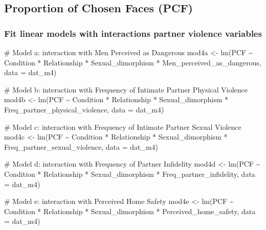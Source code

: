 \documentclass[
  bookmarksnumbered]{article}
\newenvironment{Shaded}{\begin{snugshade}}{\end{snugshade}}
\newcommand{\AttributeTok}[1]{\textcolor[rgb]{0.80,0.80,0.80}{#1}}
\newcommand{\CommentTok}[1]{\textcolor[rgb]{0.50,0.62,0.50}{#1}}
\newcommand{\FunctionTok}[1]{\textcolor[rgb]{0.94,0.94,0.56}{#1}}
\newcommand{\NormalTok}[1]{\textcolor[rgb]{0.80,0.80,0.80}{#1}}
\newcommand{\OtherTok}[1]{\textcolor[rgb]{0.94,0.94,0.56}{#1}}
\newcommand{\SpecialCharTok}[1]{\textcolor[rgb]{0.86,0.64,0.64}{#1}}
\begin{document}
\subsection{Proportion of Chosen Faces (PCF)}\label{proportion-of-chosen-faces-pcf-1}

\subsubsection{Fit linear models with interactions partner violence variables}\label{fit-linear-models-with-interactions-partner-violence-variables-3}

\begin{Shaded}
\begin{Highlighting}[]
\CommentTok{\# Model a: interaction with Men Perceived as Dangerous}
\NormalTok{mod4a }\OtherTok{\textless{}{-}} \FunctionTok{lm}\NormalTok{(PCF }\SpecialCharTok{\textasciitilde{}}
\NormalTok{              Condition }\SpecialCharTok{*}\NormalTok{ Relationship }\SpecialCharTok{*}\NormalTok{ Sexual\_dimorphism }\SpecialCharTok{*}\NormalTok{ Men\_perceived\_as\_dangerous,}
            \AttributeTok{data =}\NormalTok{ dat\_m4)}

\CommentTok{\# Model b: interaction with Frequency of Intimate Partner Physical Violence}
\NormalTok{mod4b }\OtherTok{\textless{}{-}} \FunctionTok{lm}\NormalTok{(PCF }\SpecialCharTok{\textasciitilde{}}
\NormalTok{              Condition }\SpecialCharTok{*}\NormalTok{ Relationship }\SpecialCharTok{*}\NormalTok{ Sexual\_dimorphism }\SpecialCharTok{*}\NormalTok{ Freq\_partner\_physical\_violence,}
            \AttributeTok{data =}\NormalTok{ dat\_m4)}

\CommentTok{\# Model c: interaction with Frequency of Intimate Partner Sexual Violence}
\NormalTok{mod4c }\OtherTok{\textless{}{-}} \FunctionTok{lm}\NormalTok{(PCF }\SpecialCharTok{\textasciitilde{}}
\NormalTok{              Condition }\SpecialCharTok{*}\NormalTok{ Relationship }\SpecialCharTok{*}\NormalTok{ Sexual\_dimorphism }\SpecialCharTok{*}\NormalTok{ Freq\_partner\_sexual\_violence,}
            \AttributeTok{data =}\NormalTok{ dat\_m4)}

\CommentTok{\# Model d: interaction with Frequency of Partner Infidelity}
\NormalTok{mod4d }\OtherTok{\textless{}{-}} \FunctionTok{lm}\NormalTok{(PCF }\SpecialCharTok{\textasciitilde{}}
\NormalTok{              Condition }\SpecialCharTok{*}\NormalTok{ Relationship }\SpecialCharTok{*}\NormalTok{ Sexual\_dimorphism }\SpecialCharTok{*}\NormalTok{ Freq\_partner\_infidelity,}
            \AttributeTok{data =}\NormalTok{ dat\_m4)}

\CommentTok{\# Model e: interaction with Perceived Home Safety}
\NormalTok{mod4e }\OtherTok{\textless{}{-}} \FunctionTok{lm}\NormalTok{(PCF }\SpecialCharTok{\textasciitilde{}}
\NormalTok{              Condition }\SpecialCharTok{*}\NormalTok{ Relationship }\SpecialCharTok{*}\NormalTok{ Sexual\_dimorphism }\SpecialCharTok{*}\NormalTok{ Perceived\_home\_safety,}
            \AttributeTok{data =}\NormalTok{ dat\_m4)}
\end{Highlighting}
\end{Shaded}
\end{document}
